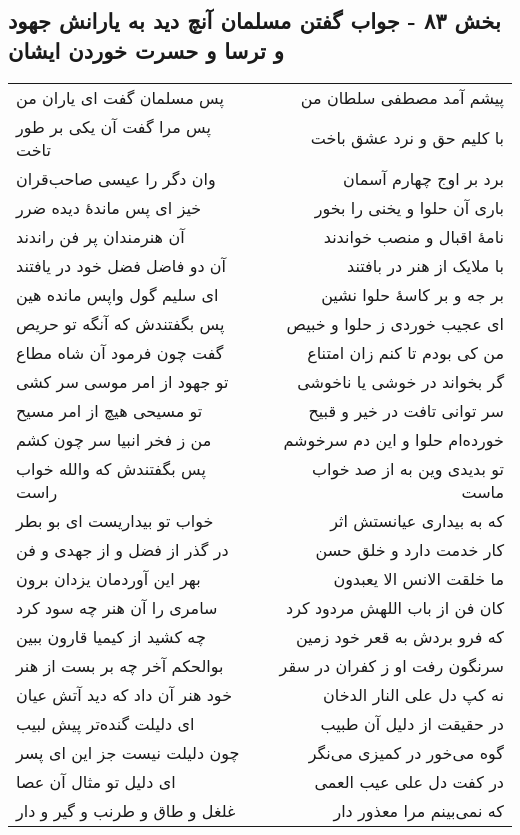 \begin{center}
\section*{بخش ۸۳ - جواب گفتن مسلمان آنچ دید به یارانش جهود و ترسا و حسرت خوردن ایشان}
\label{sec:sh083}
\begin{longtable}{l p{0.5cm} r}
پس مسلمان گفت ای یاران من
&&
پیشم آمد مصطفی سلطان من
\\
پس مرا گفت آن یکی بر طور تاخت
&&
با کلیم حق و نرد عشق باخت
\\
وان دگر را عیسی صاحب‌قران
&&
برد بر اوج چهارم آسمان
\\
خیز ای پس ماندهٔ دیده ضرر
&&
باری آن حلوا و یخنی را بخور
\\
آن هنرمندان پر فن راندند
&&
نامهٔ اقبال و منصب خواندند
\\
آن دو فاضل فضل خود در یافتند
&&
با ملایک از هنر در بافتند
\\
ای سلیم گول واپس مانده هین
&&
بر جه و بر کاسهٔ حلوا نشین
\\
پس بگفتندش که آنگه تو حریص
&&
ای عجیب خوردی ز حلوا و خبیص
\\
گفت چون فرمود آن شاه مطاع
&&
من کی بودم تا کنم زان امتناع
\\
تو جهود از امر موسی سر کشی
&&
گر بخواند در خوشی یا ناخوشی
\\
تو مسیحی هیچ از امر مسیح
&&
سر توانی تافت در خیر و قبیح
\\
من ز فخر انبیا سر چون کشم
&&
خورده‌ام حلوا و این دم سرخوشم
\\
پس بگفتندش که والله خواب راست
&&
تو بدیدی وین به از صد خواب ماست
\\
خواب تو بیداریست ای بو بطر
&&
که به بیداری عیانستش اثر
\\
در گذر از فضل و از جهدی و فن
&&
کار خدمت دارد و خلق حسن
\\
بهر این آوردمان یزدان برون
&&
ما خلقت الانس الا یعبدون
\\
سامری را آن هنر چه سود کرد
&&
کان فن از باب اللهش مردود کرد
\\
چه کشید از کیمیا قارون ببین
&&
که فرو بردش به قعر خود زمین
\\
بوالحکم آخر چه بر بست از هنر
&&
سرنگون رفت او ز کفران در سقر
\\
خود هنر آن داد که دید آتش عیان
&&
نه کپ دل علی النار الدخان
\\
ای دلیلت گنده‌تر پیش لبیب
&&
در حقیقت از دلیل آن طبیب
\\
چون دلیلت نیست جز این ای پسر
&&
گوه می‌خور در کمیزی می‌نگر
\\
ای دلیل تو مثال آن عصا
&&
در کفت دل علی عیب العمی
\\
غلغل و طاق و طرنب و گیر و دار
&&
که نمی‌بینم مرا معذور دار
\\
\end{longtable}
\end{center}
